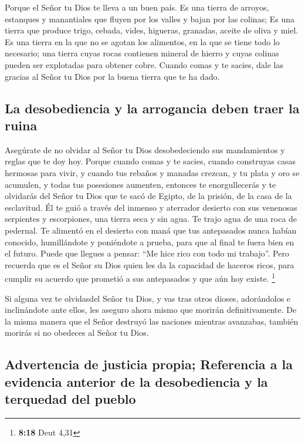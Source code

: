  Porque el Señor tu Dios te lleva a un buen país. Es una
tierra de arroyos, estanques y manantiales que fluyen por los valles y
bajan por las colinas;  Es una tierra que produce trigo,
cebada, vides, higueras, granadas, aceite de oliva y miel.
 Es una tierra en la que no se agotan los alimentos, en la
que se tiene todo lo necesario; una tierra cuyas rocas contienen mineral
de hierro y cuyas colinas pueden ser explotadas para obtener cobre.
 Cuando comas y te sacies, dale las gracias al Señor tu
Dios por la buena tierra que te ha dado.

\hypertarget{la-desobediencia-y-la-arrogancia-deben-traer-la-ruina}{%
\subsection{La desobediencia y la arrogancia deben traer la
ruina}\label{la-desobediencia-y-la-arrogancia-deben-traer-la-ruina}}

 Asegúrate de no olvidar al Señor tu Dios desobedeciendo
sus mandamientos y reglas que te doy hoy.  Porque cuando
comas y te sacies, cuando construyas casas hermosas para vivir,
 y cuando tus rebaños y manadas crezcan, y tu plata y oro
se acumulen, y todas tus posesiones aumenten,  entonces
te enorgullecerás y te olvidarás del Señor tu Dios que te sacó de
Egipto, de la prisión, de la casa de la esclavitud.  Él
te guió a través del inmenso y aterrador desierto con sus venenosas
serpientes y escorpiones, una tierra seca y sin agua. Te trajo agua de
una roca de pedernal.  Te alimentó en el desierto con
maná que tus antepasados nunca habían conocido, humillándote y
poniéndote a prueba, para que al final te fuera bien en el futuro.
 Puede que llegues a pensar: ``Me hice rico con todo mi
trabajo''.  Pero recuerda que es el Señor su Dios quien
les da la capacidad de haceros ricos, para cumplir su acuerdo que
prometió a sus antepasados y que aún hoy existe. \footnote{\textbf{8:18}
  Deut 4,31}

 Si alguna vez te olvidasdel Señor tu Dios, y vas tras
otros dioses, adorándolos e inclinándote ante ellos, les aseguro ahora
mismo que morirán definitivamente.  De la misma manera
que el Señor destruyó las naciones mientras avanzabas, también morirás
si no obedeces al Señor tu Dios.

\hypertarget{advertencia-de-justicia-propia-referencia-a-la-evidencia-anterior-de-la-desobediencia-y-la-terquedad-del-pueblo}{%
\subsection{Advertencia de justicia propia; Referencia a la evidencia
anterior de la desobediencia y la terquedad del
pueblo}\label{advertencia-de-justicia-propia-referencia-a-la-evidencia-anterior-de-la-desobediencia-y-la-terquedad-del-pueblo}}

